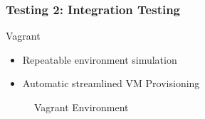 \begin{frame}
\frametitle{Testing 2: Integration Testing}

\begin{block}{Vagrant}

\begin{itemize}
\item Repeatable environment simulation
\item Automatic streamlined VM Provisioning
\end{itemize}

\end{block}

\begin{figure}
\caption*{Vagrant Environment}
\end{figure}

\end{frame}
